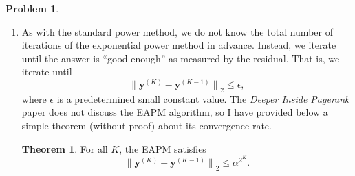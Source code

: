 \documentclass[10pt]{exam}
\theoremstyle{definition}
\newtheorem{problem}{Problem}
\newtheorem{theorem}{Theorem}
\newcommand{\x}{\mathbf x}
\newcommand{\y}{\mathbf y}
\newcommand{\ltwo}[1]{{\lVert {#1} \rVert}_2}
\begin{document}
\begin{problem}
\begin{enumerate}
        \newpage
        \item
            As with the standard power method, we do not know the total number of iterations of the exponential power method in advance.
            Instead, we iterate until the answer is ``good enough'' as measured by the residual.
            That is, we iterate until
            \begin{equation}
                \label{eq:exp:eps}
                \ltwo{\y^{(K)}-\y^{(K-1)}} \le \epsilon,
            \end{equation}
            where $\epsilon$ is a predetermined small constant value.
            The \emph{Deeper Inside Pagerank} paper does not discuss the EAPM algorithm, so I have provided below a simple theorem (without proof) about its convergence rate.
            \begin{theorem}
                \label{thm:EAPM}
                For all $K$, the EAPM satisfies
                \begin{equation}
                    \ltwo{\y^{(K)}-\y^{(K-1)}} \le \alpha^{2^K}.
                \end{equation}
            \end{theorem}


\end{enumerate}
\end{problem}
\end{document}

